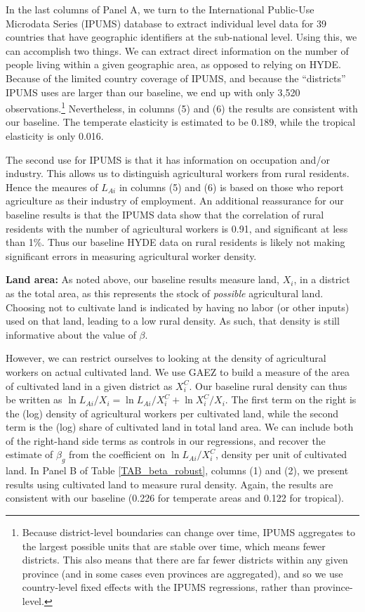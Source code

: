 \documentclass[11pt]{article}
\begin{document}
In the last columns of Panel A, we turn to the International Public-Use Microdata Series (IPUMS) database \nocite{ipums} to extract individual level data for 39 countries that have geographic identifiers at the sub-national level. Using this, we can accomplish two things. We can extract direct information on the number of people living within a given geographic area, as opposed to relying on HYDE. Because of the limited country coverage of IPUMS, and because the ``districts'' IPUMS uses are larger than our baseline, we end up with only 3,520 observations.\footnote{Because district-level boundaries can change over time, IPUMS aggregates to the largest possible units that are stable over time, which means fewer districts. This also means that there are far fewer districts within any given province (and in some cases even provinces are aggregated), and so we use country-level fixed effects with the IPUMS regressions, rather than province-level.} Nevertheless, in columns (5) and (6) the results are consistent with our baseline. The temperate elasticity is estimated to be 0.189, while the tropical elasticity is only 0.016. 

The second use for IPUMS is that it has information on occupation and/or industry. This allows us to distinguish agricultural workers from rural residents. Hence the meaures of $L_{Ai}$ in columns (5) and (6) is based on those who report agriculture as their industry of employment. An additional reassurance for our baseline results is that the IPUMS data show that the correlation of rural residents with the number of agricultural workers is 0.91, and significant at less than 1\%. Thus our baseline HYDE data on rural residents is likely not making significant errors in measuring agricultural worker density.

\vspace{.5cm}\noindent\textbf{Land area:} As noted above, our baseline results measure land, $X_i$, in a district as the total area, as this represents the stock of \textit{possible} agricultural land. Choosing not to cultivate land is indicated by having no labor (or other inputs) used on that land, leading to a low rural density. As such, that density is still informative about the value of $\beta$.

However, we can restrict ourselves to looking at the density of agricultural workers on actual cultivated land. We use GAEZ to build a measure of the area of cultivated land in a given district as $X^C_i$. Our baseline rural density can thus be written as $\ln L_{Ai}/X_i = \ln L_{Ai}/X_i^C + \ln X_i^C/X_i$. The first term on the right is the (log) density of agricultural workers per cultivated land, while the second term is the (log) share of cultivated land in total land area. We can include both of the right-hand side terms as controls in our regressions, and recover the estimate of $\beta_g$ from the coefficient on $\ln L_{Ai}/X_i^C$, density per unit of cultivated land. In Panel B of Table \ref{TAB_beta_robust}, columns (1) and (2), we present results using cultivated land to measure rural density. Again, the results are consistent with our baseline (0.226 for temperate areas and 0.122 for tropical). 
\end{document}
